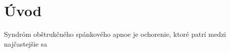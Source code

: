 
\setcounter{page}{1} %
\chapter{Úvod} \label{kap:Uvod}

\pagestyle{fancy}
\fancyhf{}
\fancyfoot[CE,CO]{\thepage}
\renewcommand{\footrulewidth}{1pt}





Syndróm obštrukčného spánkového apnoe je ochorenie, ktoré patrí medzi najčastejšie sa
%
%
%



